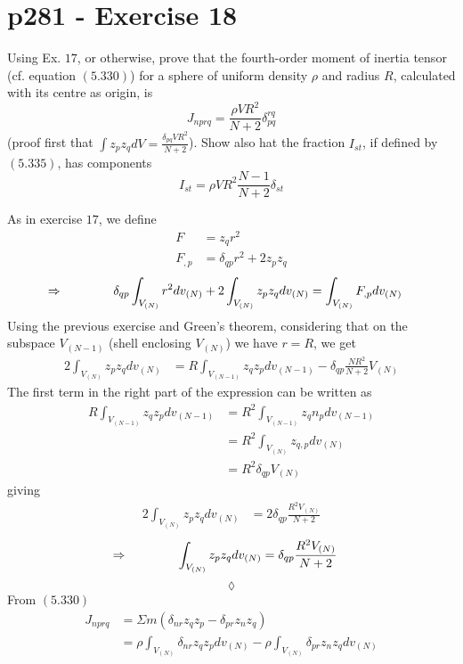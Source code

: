 \section{p281 - Exercise 18}
\begin{tcolorbox}
Using Ex. $17$, or otherwise, prove that the fourth-order moment of inertia tensor (cf. equation $\mathbf{(5.330)}$) for a sphere of uniform density $\rho$ and radius $R$, calculated with its centre as origin, is
$$J_{nprq} = \frac{\rho V R^2}{N+2}\delta_{pq}^{rq}$$
(proof first that $\int z_p z_qdV = \frac{\delta_{pq} V R^2}{N+2}$).
Show also hat the fraction $I_{st}$, if defined by $\mathbf{(5.335)}$, has components
$$I_{st}=\rho V R^2 \frac{N-1}{N+2}\delta_{st}$$
\end{tcolorbox}
As in exercise $17$, we define
\begin{align}
F&= z_q r^2\\
F_{,p}&=\delta_{qp}r^2+2z_pz_q
\end{align}
\begin{align}
\Rightarrow\quad\quad\quad\quad \delta_{qp}\int_{V_{(N)}}r^2 dv_{(N)} +2\int_{V_{(N)}}z_pz_q dv_{(N)} &= \int_{V_{(N)}}F_{,p}dv_{(N)}
\end{align}
Using the previous exercise and Green's theorem,  considering that on the subspace $V_{(N-1)}$ (shell enclosing $V_{(N)}$) we have $r=R$, we get 
\begin{align}
2\int_{V_{(N)}}z_pz_qdv_{(N)} &= R\int_{V_{(N-1)}}z_q z_p dv_{(N-1)}-\delta_{qp}\frac{NR^2}{N+2}{V_{(N)}}
\end{align}
The first term in the right part of the expression can be written as
\begin{align}
R\int_{V_{(N-1)}}z_q z_p dv_{(N-1)}&= R^2\int_{V_{(N-1)}}z_q n_pdv_{(N-1)}\\
&=  R^2\int_{V_{(N)}}z_{q,p}dv_{(N)}\\
&=  R^2\delta_{qp}V_{(N)}
\end{align}
giving
\begin{align}
2\int_{V_{(N)}}z_pz_qdv_{(N)} &=  2\delta_{qp}\frac{R^2V_{(N)}}{N+2}
\end{align}
\begin{align}
\Rightarrow \quad\quad\quad\quad \int_{V_{(N)}}z_pz_qdv_{(N)} &=  \delta_{qp}\frac{R^2V_{(N)}}{N+2}
\end{align}
$$\lozenge$$
From $\mathbf{(5.330)}$ 
\begin{align}
J_{nprq} &= \Sigma m \left(\delta_{nr}z_q z_p-\delta_{pr}z_n z_q\right)\\
&= \rho\int_{V_{(N)}} \delta_{nr}z_q z_p dv_{(N)}-\rho\int_{V_{(N)}}\delta_{pr}z_n z_q dv_{(N)}
\end{align}
